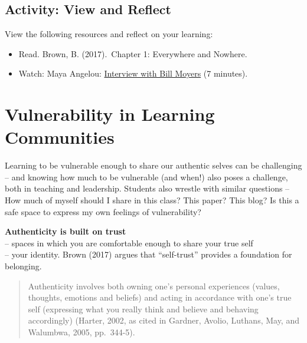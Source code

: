 \documentclass[
]{book}
\providecommand{\tightlist}{%
  \setlength{\itemsep}{0pt}\setlength{\parskip}{0pt}}
\begin{document}
\hypertarget{activity-view-and-reflect}{%
\subsection*{Activity: View and Reflect}\label{activity-view-and-reflect}}

\begin{reflect}
View the following resources and reflect on your learning:

\begin{itemize}
\tightlist
\item
  Read. Brown, B. (2017).~Chapter 1: Everywhere and Nowhere.\\
\item
  Watch: Maya Angelou:
  \href{http://billmoyers.com/content/conversation-maya-angelou/}{Interview
  with Bill Moyers} (7 minutes).
\end{itemize}
\end{reflect}

\hypertarget{vulnerability-in-learning-communities}{%
\section{Vulnerability in Learning Communities}\label{vulnerability-in-learning-communities}}

Learning to be vulnerable enough to share our authentic selves can be challenging -- and knowing how much to be vulnerable (and when!) also poses a challenge, both in teaching and leadership. Students also wrestle with similar questions -- How much of myself should I share in this class? This paper? This blog? Is this a safe space to express my own feelings of vulnerability?

\textbf{Authenticity is built on trust}\\
-- spaces in which you are comfortable enough to share your true self\\
-- your identity. Brown (2017) argues that ``self-trust'' provides a foundation for belonging.

\begin{quote}
Authenticity involves both owning one's personal experiences (values, thoughts, emotions and beliefs) and acting in accordance with one's true self (expressing what you really think and believe and behaving accordingly) (Harter, 2002, as cited in Gardner, Avolio, Luthans, May, and Walumbwa, 2005, pp.~344-5).
\end{quote}
\end{document}
